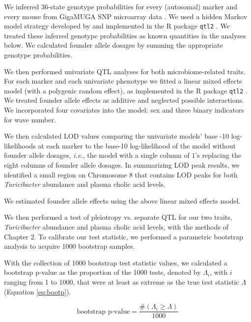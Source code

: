 \documentclass[oneside]{book}
\begin{document}
We inferred 36-state genotype probabilities for every (autosomal) 
marker and every mouse from GigaMUGA SNP microarray data \citep{morgan2015mouse}. We used a hidden Markov model strategy developed by 
\citet{broman2012genotype, broman2012haplotype} and implemented in 
the R package \texttt{qtl2} \citep{broman2019rqtl2}. We treated these inferred 
genotype probabilities as known quantities in the analyses below. 
We calculated founder allele dosages by summing the appropriate 
genotype probabilities. 


We then performed univariate QTL analyses for both microbiome-related 
traits. 
For each marker and each univariate phenotype we fitted a linear mixed effects model (with a polygenic random effect), as implemented in the R package \texttt{qtl2} \citep{broman2019rqtl2}. We treated founder allele effects as additive and neglected possible interactions. We incorporated four covariates into the model: sex and three binary indicators for wave number. 



We then calculated LOD values comparing the univariate models' base
-10 log-likelihoods  at each marker to the base-10 log-likelihood of 
the model without founder allele dosages, \emph{i.e.}, the model 
with a single column of $1$'s replacing the eight columns of founder 
allele dosages. In summarizing LOD peak results, we identified a 
small region on Chromosome 8 that contains LOD peaks for both 
\emph{Turicibacter} abundance and plasma cholic acid levels.



We estimated founder allele effects using the above linear mixed effects model. 

We then performed a test of pleiotropy vs. separate QTL for our two traits, \emph{Turicibacter} abundance and plasma cholic acid levels, with the methods of Chapter 2. To calibrate our test statistic, we performed a parametric bootstrap analysis to acquire 1000 bootstrap samples. 

With the collection of 1000 bootstrap test statistic values, we calculated a bootstrap p-value as the proportion of the 1000 tests, denoted by $\Lambda_i$, with $i$ ranging from 1 to 1000, that were at least as extreme as the true test statistic $\Lambda$ (Equation \ref{eq:bootp}).

\begin{equation}
\text{bootstrap p-value} = \frac{\#(\Lambda_i \geq \Lambda)}{1000}
\label{eq:bootp}
\end{equation}
\end{document}

